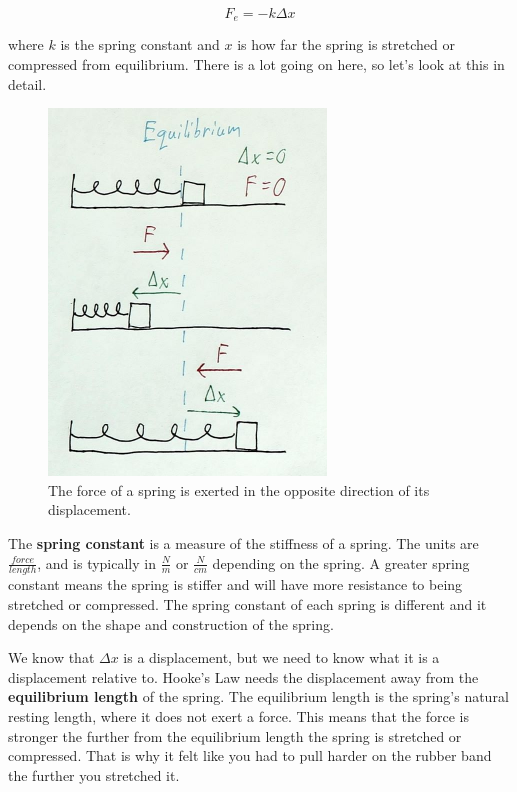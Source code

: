 \documentclass[12pt]{book}
\begin{document}
\begin{equation}
F_e = -k \Delta x
\label{hooke}
\end{equation}

where $k$ is the spring constant and $x$ is how far the spring is stretched or compressed from equilibrium. There is a lot going on here, so let's look at this in detail.

\begin{figure}[H]
\centering
\includegraphics[scale=0.7]{spring_intro.png}
\caption{The force of a spring is exerted in the opposite direction of its displacement.}
\label{springintro}
\end{figure}

The \textbf{spring constant} is a measure of the stiffness of a spring. The units are $\frac{force}{length}$, and is typically in $\frac{N}{m}$ or $\frac{N}{cm}$ depending on the spring. A greater spring constant means the spring is stiffer and will have more resistance to being stretched or compressed. The spring constant of each spring is different and it depends on the shape and construction of the spring.

We know that $\Delta x$ is a displacement, but we need to know what it is a displacement relative to. Hooke's Law needs the displacement away from the \textbf{equilibrium length} of the spring. The equilibrium length is the spring's natural resting length, where it does not exert a force. This means that the force is stronger the further from the equilibrium length the spring is stretched or compressed. That is why it felt like you had to pull harder on the rubber band the further you stretched it.
\end{document}
